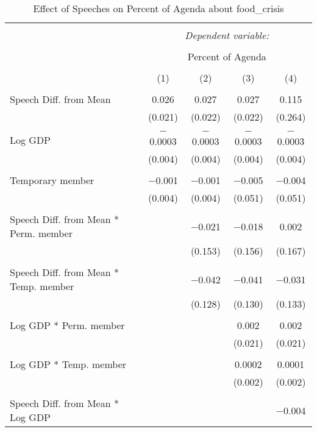 
\begin{table}[!htbp] \centering 
  \caption{Effect of Speeches on Percent of Agenda about food_crisis} 
  \label{} 
\begin{tabular}{@{\extracolsep{5pt}}lcccc} 
\\[-1.8ex]\hline 
\hline \\[-1.8ex] 
 & \multicolumn{4}{c}{\textit{Dependent variable:}} \\ 
\cline{2-5} 
\\[-1.8ex] & \multicolumn{4}{c}{Percent of Agenda} \\ 
\\[-1.8ex] & (1) & (2) & (3) & (4)\\ 
\hline \\[-1.8ex] 
 Speech Diff. from Mean & 0.026 & 0.027 & 0.027 & 0.115 \\ 
  & (0.021) & (0.022) & (0.022) & (0.264) \\ 
  & & & & \\ 
 Log GDP & $-$0.0003 & $-$0.0003 & $-$0.0003 & $-$0.0003 \\ 
  & (0.004) & (0.004) & (0.004) & (0.004) \\ 
  & & & & \\ 
 Temporary member & $-$0.001 & $-$0.001 & $-$0.005 & $-$0.004 \\ 
  & (0.004) & (0.004) & (0.051) & (0.051) \\ 
  & & & & \\ 
 Speech Diff. from Mean * Perm. member &  & $-$0.021 & $-$0.018 & 0.002 \\ 
  &  & (0.153) & (0.156) & (0.167) \\ 
  & & & & \\ 
 Speech Diff. from Mean * Temp. member &  & $-$0.042 & $-$0.041 & $-$0.031 \\ 
  &  & (0.128) & (0.130) & (0.133) \\ 
  & & & & \\ 
 Log GDP * Perm. member &  &  & 0.002 & 0.002 \\ 
  &  &  & (0.021) & (0.021) \\ 
  & & & & \\ 
 Log GDP * Temp. member &  &  & 0.0002 & 0.0001 \\ 
  &  &  & (0.002) & (0.002) \\ 
  & & & & \\ 
 Speech Diff. from Mean * Log GDP &  &  &  & $-$0.004 \\ 

\end{tabular}
\end{table}
